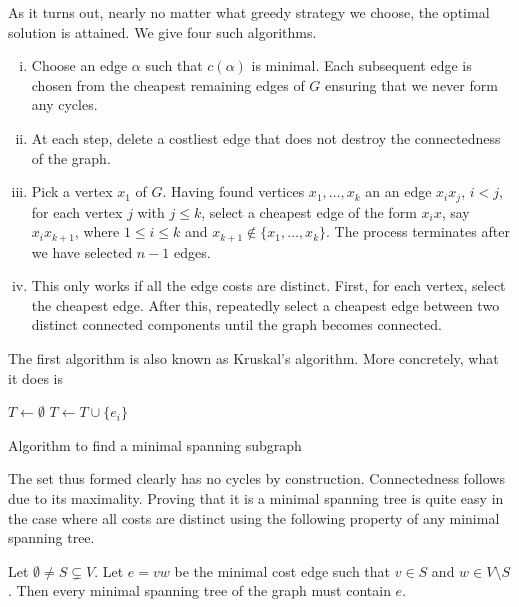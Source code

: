 As it turns out, nearly no matter what greedy strategy we choose, the optimal solution is attained. We give four such algorithms.
\begin{enumerate}[(i)]
	\item Choose an edge $\alpha$ such that $c(\alpha)$ is minimal. Each subsequent edge is chosen from the cheapest remaining edges of $G$ ensuring that we never form any cycles.
	
	\item At each step, delete a costliest edge that does not destroy the connectedness of the graph.
	
	\item Pick a vertex $x_1$ of $G$. Having found vertices $x_1,\ldots,x_k$ an an edge $x_ix_j$, $i<j$, for each vertex $j$ with $j\leq k$, select a cheapest edge of the form $x_ix$, say $x_i x_{k+1}$, where $1\leq i\leq k$ and $x_{k+1}\not\in\{x_1,\ldots,x_k\}$. The process terminates after we have selected $n-1$ edges.
	
	\item This only works if all the edge costs are distinct. First, for each vertex, select the cheapest edge. After this, repeatedly select a cheapest edge between two distinct connected components until the graph becomes connected.
\end{enumerate}

The first algorithm is also known as Kruskal's algorithm. More concretely, what it does is 

\begin{algorithm}
	\DontPrintSemicolon
	\SetNoFillComment
	\; 
	$T\gets\emptyset$\;
	 {
		 {
			$T\gets T\cup\{e_i\}$
		}
	}
	\caption{Algorithm to find a minimal spanning subgraph}\label{algo: kruskel's algorithm}
\end{algorithm}

The set thus formed clearly has no cycles by construction. Connectedness follows due to its maximality. Proving that it is a minimal spanning tree is quite easy in the case where all costs are distinct using the following property of any minimal spanning tree.

\begin{lemma}
	Let $\emptyset\neq S\subsetneq V$. Let $e=vw$ be the minimal cost edge such that $v\in S$ and $w\in V\setminus S$. Then every minimal spanning tree of the graph must contain $e$.
\end{lemma}

